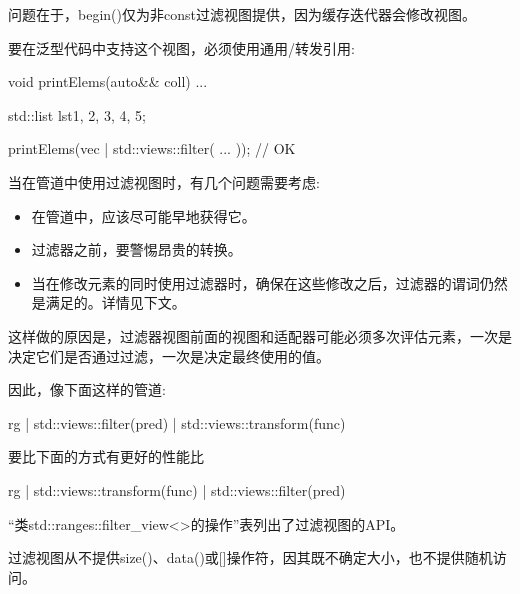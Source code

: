 问题在于，begin()仅为非const过滤视图提供，因为缓存迭代器会修改视图。

要在泛型代码中支持这个视图，必须使用通用/转发引用:

\begin{cpp}
void printElems(auto&& coll) {
	...
}

std::list lst{1, 2, 3, 4, 5};

printElems(vec | std::views::filter( ... )); // OK
\end{cpp}


当在管道中使用过滤视图时，有几个问题需要考虑:

\begin{itemize}
\item
在管道中，应该尽可能早地获得它。

\item
过滤器之前，要警惕昂贵的转换。

\item
当在修改元素的同时使用过滤器时，确保在这些修改之后，过滤器的谓词仍然是满足的。详情见下文。
\end{itemize}

这样做的原因是，过滤器视图前面的视图和适配器可能必须多次评估元素，一次是决定它们是否通过过滤，一次是决定最终使用的值。

因此，像下面这样的管道:

\begin{cpp}
rg | std::views::filter(pred) | std::views::transform(func)
\end{cpp}

要比下面的方式有更好的性能比

\begin{cpp}
rg | std::views::transform(func) | std::views::filter(pred)
\end{cpp}


“类std::ranges::filter\_view<>的操作”表列出了过滤视图的API。

过滤视图从不提供size()、data()或[]操作符，因其既不确定大小，也不提供随机访问。

